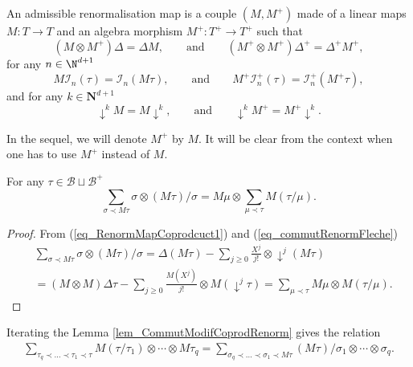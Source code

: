 \documentclass[11pt]{preprint}
\newcommand{\mcB}{\mathcal{B}}
\newcommand{\mcI}{\mathcal{I}}
\def\eqref#1{(\ref{#1})}
\newcommand{\bfN}{\mathbf{N}}
\begin{document}
	
	\begin{definition}
		An admissible renormalisation map is a couple $(M,M^+)$ made of a linear maps $M : T \to T$ and an algebra morphism $M^+ : T^+ \to T^+$ such that 
		\begin{equation}\label{eq_RenormMapCoprodcuct1}
			(M\otimes M^+)\Delta = \Delta M, \qquad \text{and} \qquad (M^+\otimes M^+)\Delta^{\!+} = \Delta^{\!+} M^+,
		\end{equation}
	for any $n\in \N^{d+1}$
		\begin{equation}\label{eq_commut_MandMcI}
			M\mcI_n(\tau) = \mcI_n(M\tau), \qquad \text{and} \qquad 	M^+\mcI^+_n(\tau) = \mcI^+_n (M^+\tau),
		\end{equation}
		and for any $k\in\bfN^{d+1}$
		\begin{equation}\label{eq_commutRenormFleche}
			\downarrow^k M =M\downarrow^k,\qquad \text{and}\qquad \downarrow^k M^{+} =M^{+}\downarrow^k.
		\end{equation}
	\end{definition}
In the sequel, we will denote $M^+$ by $M$. It will be clear from the context when one has to use $M^+$ instead of $M$.
	
	\begin{lemma} \label{lem_CommutModifCoprodRenorm}
		For any $\tau\in\mcB\sqcup \mcB^+$
		$$
		\sum_{\sigma\prec M\tau} \sigma\otimes (M\tau)/\sigma   = M\mu \otimes \sum_{\mu\prec\tau} M(\tau/\mu).
		$$
	\end{lemma}
	
	\begin{proof}
		From  \eqref{eq_RenormMapCoprodcuct1} and \eqref{eq_commutRenormFleche}
		\begin{align*}
		&	\sum_{\sigma\prec M\tau} \sigma \otimes (M\tau)/\sigma  = \Delta(M\tau) - \sum_{j\geq 0}  \frac{X^j}{j!}  \otimes \downarrow^j(M\tau) 
			\\
			&= (M\otimes M)\Delta\tau - \sum_{j\geq 0}  \frac{M(X^j)}{j!} \otimes  M(\downarrow^j\tau) 
			=\sum_{\mu\prec\tau}  M\mu\otimes M(\tau/\mu).
		\end{align*}
	\end{proof}
	Iterating the Lemma \ref{lem_CommutModifCoprodRenorm} gives the relation
	\begin{align*} \label{lem_CommutModifCoprodRenorm_Iterated}
		\sum_{\tau_q\prec\dots\prec\tau_1\prec\tau}  M(\tau/\tau_1) \otimes  \cdots \otimes  M\tau_q
		=
		\sum_{\sigma_q\prec\dots\prec\sigma_1\prec M\tau} (M\tau)/\sigma_1 \otimes  \cdots \otimes  \sigma_q.
	\end{align*}
	
\end{document}
